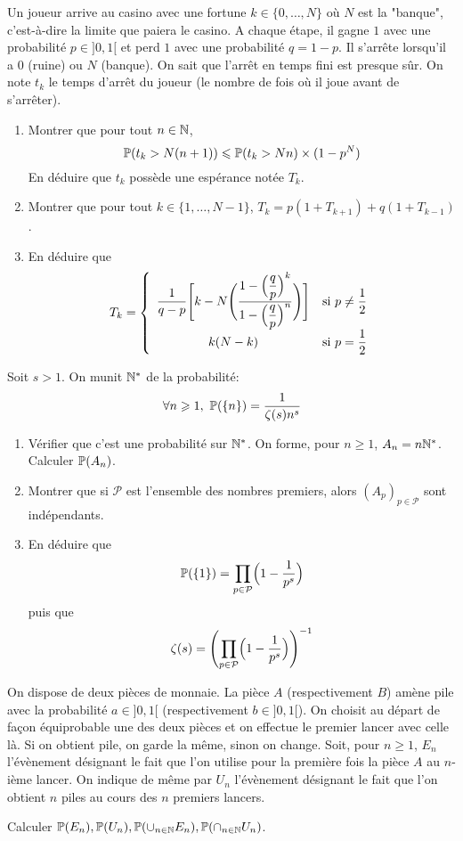 \documentclass[12pt]{article}
\begin{document}
\begin{exercise}
	Un joueur arrive au casino avec une fortune $k\in\{0,\dots,N\}$ où $N$ est la
	"banque", c'est-à-dire la limite que paiera le casino. A chaque étape, il
	gagne $1$ avec une probabilité $p\in]0,1[$ et perd $1$ avec une probabilité
	$q=1-p$. Il s'arrête lorsqu'il a 0 (ruine) ou $N$ (banque). On sait que
	l'arrêt en temps fini est presque sûr. On note $t_{k}$ le temps d'arrêt du
	joueur (le nombre de fois où il joue avant de s'arrêter).
	\begin{enumerate}
		\item
		Montrer que pour tout $n\in\N$,
		$$\P(t_{k}>N(n+1))\leqslant\P(t_{k}>Nn)\times(1-p^{N})$$ En déduire que
		$t_{k}$ possède une espérance notée $T_{k}$.
		\item
		Montrer que pour tout $k\in\{1,\dots,N-1\}$,
		$T_{k}=p(1+T_{k+1})+q(1+T_{k-1})$.
		\item
		En déduire que 
		$$T_{k}= \left\{
			\begin{array}[]{cc}
				\dfrac{1}{q-p}\Biggl[k-N\Biggl(\dfrac{1-\Bigl(\dfrac{q}{p}\Bigr)^{k}}{1-\Bigl(\dfrac{q}{p}\Bigr)^{n}}\Biggr)\Biggr]
& \text{si }p\neq\dfrac{1}{2}\\
				k(N-k) & \text{si }p=\dfrac{1}{2}
			\end{array}
		\right.$$
	\end{enumerate}
\end{exercise}

\begin{exercise}
	Soit $s>1$. On munit $\N^{*}$ de la probabilité:
	$$\forall n\geqslant1,~\P(\{n\})=\frac{1}{\zeta(s)n^{s}}$$
	\begin{enumerate}
		\item
		Vérifier que c'est une probabilité sur $\N^{*}$. On forme, pour
		$n\geqslant 1$, $A_{n}=n\N^{*}$. Calculer $\P(A_{n})$.
		\item
		Montrer que si $\mathcal{P}$ est l'ensemble des nombres premiers, alors
		$(A_{p})_{p\in\mathcal{P}}$ sont indépendants.
		\item
		En déduire que 
		$$\P(\{1\})=\prod_{p\in\mathcal{P}}\Bigl(1-\frac{1}{p^{s}}\Bigr)$$ puis
		que 
		$$\zeta(s)=\Biggl(\prod_{p\in\mathcal{P}}\Bigl(1-\frac{1}{p^{s}}\Bigr)\Biggr)^{-1}$$
	\end{enumerate}
\end{exercise}

\begin{exercise}
	On dispose de deux pièces de monnaie. La pièce $A$ (respectivement $B$) amène
	pile avec la probabilité $a\in]0,1[$ (respectivement $b\in]0,1[$). On choisit
	au départ de façon équiprobable une des deux pièces et on effectue le premier
	lancer avec celle là. Si on obtient pile, on garde la même, sinon on change.
	Soit, pour $n\geqslant1$, $E_{n}$ l'évènement désignant le fait que l'on
	utilise pour la première fois la pièce $A$ au $n$-ième lancer. On indique de
	même par $U_{n}$ l'évènement désignant le fait que l'on obtient $n$ piles au
	cours des $n$ premiers lancers.

	Calculer $\P(E_{n}),\P(U_{n}),\P(\cup_{n\in\N}E_{n}),\P(\cap_{n\in\N}U_{n})$.
\end{exercise}
\end{document}
